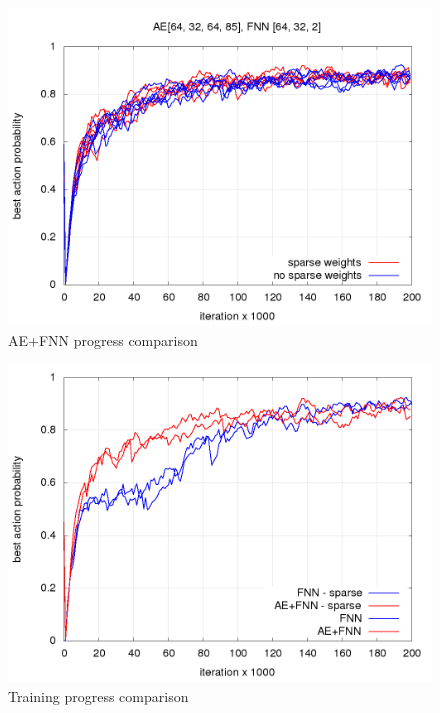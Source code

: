 \documentclass[10pt,a4paper]{article}
\begin{document}
\begin{figure}[!h]
  \centering
  \includegraphics[scale=0.4]{../../results/rl_arcade/hnn_progress/training_progress.png}
  \caption{AE+FNN progress comparison}
  \label{img:AE+FNN progress comparison}
\end{figure}

\begin{figure}[!h]
  \centering
  \includegraphics[scale=0.4]{../../results/rl_arcade/training_progress.png}
  \caption{Training progress comparison}
  \label{img:Training progress comparison}
\end{figure}
\end{document}
